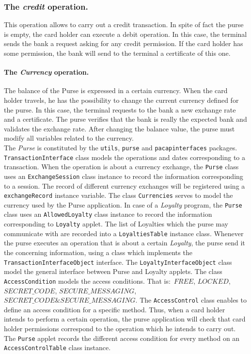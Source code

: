 \documentclass[a4paper]{llncs}
\begin{document}
\subsubsection{\bf The \textit{credit} operation.} This operation allows
to carry out a credit transaction. In spite of fact the purse is
empty, the
card holder can execute a debit operation. In this case, the terminal
sends the bank a request asking for any credit permission. If the card 
holder has some permission, the bank will send to the terminal a
certificate of this one.


\paragraph{\bf The \textit{Currency} operation.} The balance of the
Purse is expressed in a certain currency. When the card holder
travels, he has the possibility to
change the current currency defined for the purse. In this case, the
terminal requests to the bank a
new exchange rate and a certificate. The purse verifies that the bank is 
really the expected bank and validates the exchange rate. After
changing the balance value, the purse must modify all variables related
to the currency. \\

The \textit{Purse} is constituted by the \texttt{utils}, \texttt{purse}
and \texttt{pacapinterfaces} packages. \texttt{TransactionInterface}
class models the operations and dates corresponding to a
transaction. When the operation is about a currency exchange, the
\texttt{Purse} class uses an \texttt{ExchangeSession} class instance to 
record the information corresponding to a session. The record of
different currency exchanges will be registered using a
\texttt{exchangeRecord} instance variable. The class
\texttt{Currencies} serves to model the currency used by the Purse
application. 
In case of a \textit{Loyalty} program, the \texttt{Purse} class uses
an \texttt{AllowedLoyalty} class instance to record the information
corresponding to \texttt{Loyalty} applet. The list of Loyalties which
the purse may communicate with are recorded into a
\texttt{LoyaltiesTable} instance class. Whenever the purse executes an 
operation that is about a certain \textit{Loyalty}, the purse send it
the concerning information, using a class which implements the
\texttt{TransactionInterfaceObject} interface. The
\texttt{LoyaltyInterfaceObject} class model the general interface
between Purse and Loyalty applets. The class
\texttt{AccessCondition} models the access conditions. That is$:$
$FREE$, $LOCKED$, $SECRET\_CODE$, $SECURE\_MESSAGING$, $SECRET\_CODE \&
SECURE\_MESSAGING$. The \texttt{AccessControl} class enables to define
an access condition for a specific method. Thus, when a
card holder intends to perform a certain operation, the purse
application will check that card holder permissions correspond to the
operation which he intends to carry out. The \texttt{Purse} applet
records the different access condition for every method on an
\texttt{AccessControlTable} class instance.
\end{document}
